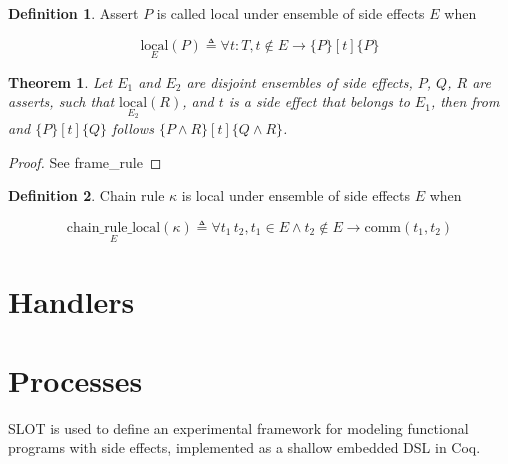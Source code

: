 \documentclass[10pt,letterpaper]{article}
\newcommand \comm[2]{\mathrel{\text{comm}\left(#1,#2\right)}}
\newcommand \local[2]{\mathrel{\underset{#1}{\text{local}}\left(#2\right)}}
\newcommand \crlocal[2]{\mathrel{\underset{#1}{\text{chain\_rule\_local}}\left(#2\right)}}
\newtheorem{theorem}{Theorem}
\theoremstyle{definition}
\newtheorem{definition}{Definition}
\begin{document}
\begin{definition}
  Assert $P$ is called local under ensemble of side effects $E$ when

  \begin{equation}
  \local{E}{P} \triangleq \forall t:T,t \notin E \to \{P\} [t] \{P\}
  \end{equation}
\end{definition}

\begin{theorem}
  Let $E_1$ and $E_2$ are disjoint ensembles of side effects, $P$,
  $Q$, $R$ are asserts, such that $\local{E_2}{R}$, and $t$ is a side
  effect that belongs to $E_1$, then from and $\{P\} [t] \{Q\}$
  follows $\{P \land R\}[t]\{Q \land R\}$.
\end{theorem}
\begin{proof}
  See \mbox{frame\_rule}
\end{proof}

\begin{definition}
  Chain rule $\kappa$ is local under ensemble of side effects $E$ when

  \begin{equation}
    \crlocal{E}{\kappa} \triangleq \forall t_1\, t_2, t_1 \in E \land t_2 \notin E \to \comm{t_1}{t_2}
  \end{equation}
\end{definition}


\section{Handlers}

\section{Processes}

SLOT is used to define an experimental framework for modeling
functional programs with side effects, implemented as a shallow
embedded DSL in Coq.
\end{document}
